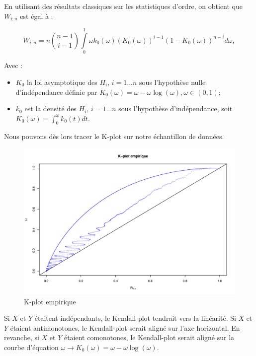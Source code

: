 En utilisant des résultats classiques sur les statistiques d’ordre, on obtient que $W_{i:n}$ est égal à :

$$
W_{i:n}= n {n-1 \choose i-1} \int\limits_{0}^1 \omega k_0(\omega) ( K_0(\omega) )^{i-1} ( 1-K_0(\omega) )^{n-i} d\omega, 
$$

Avec :

\begin{itemize}
\item $K_0$ la loi asymptotique des $H_i$, $i=1...n$ sous l’hypothèse nulle d’indépendance définie par $K_0(\omega) = \omega - \omega \operatorname{log} (\omega), \omega \in (0,1)$;
\item $k_0$ est la densité des $H_i$, $i=1...n$ sous l’hypothèse d’indépendance, soit $K_0(\omega) = \int_0^\omega k_0(t)dt$.
\end{itemize}

Nous pouvons dès lors tracer le K-plot sur notre échantillon de données.

\noindent%
\begin{figure}[H]
    \begin{center}
      \includegraphics[width=14 cm, angle=0]{./pictures/K_plot_empir.png}
      \centering\caption{K-plot empirique}
    \end{center}
\end{figure}

Si $X$ et $Y$ étaitent indépendants, le Kendall-plot tendrait vers la linéarité.
Si $X$ et $Y$ étaient antimonotones, le Kendall-plot serait aligné sur l'axe horizontal.
En revanche, si $X$ et $Y$ étaient comonotones, le Kendall-plot serait aligné sur la courbe d’équation $\omega \longrightarrow K_0(\omega) = \omega - \omega \operatorname{log} (\omega)$.

